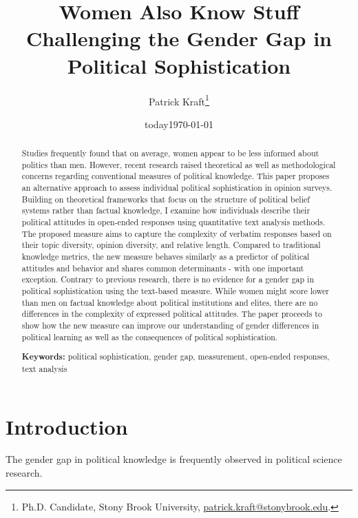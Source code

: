 \documentclass[12pt]{article}
\author{Patrick Kraft\footnote{Ph.D. Candidate, Stony Brook University, \href{mailto:patrick.kraft@stonybrook.edu}{patrick.kraft@stonybrook.edu}.
}}
\date{today}
\title{Women Also Know Stuff\\
\large{Challenging the Gender Gap in Political Sophistication}}
\date{\today}
\begin{document}
\maketitle\doublespacing\thispagestyle{empty}

\begin{abstract}\singlespacing
Studies frequently found that on average, women appear to be less informed about politics than men. However, recent research raised theoretical as well as methodological concerns regarding conventional measures of political knowledge. This paper proposes an alternative approach to assess individual political sophistication in opinion surveys. Building on theoretical frameworks that focus on the structure of political belief systems rather than factual knowledge, I examine how individuals describe their political attitudes in open-ended responses using quantitative text analysis methods. The proposed measure aims to capture the complexity of verbatim responses based on their topic diversity, opinion diversity, and relative length. Compared to traditional knowledge metrics, the new measure behaves similarly as a predictor of political attitudes and behavior and shares common determinants - with one important exception. Contrary to previous research, there is no evidence for a gender gap in political sophistication using the text-based measure. While women might score lower than men on factual knowledge about political institutions and elites, there are no differences in the complexity of expressed political attitudes. The paper proceeds to show how the new measure can improve our understanding of gender differences in political learning as well as the consequences of political sophistication. 

\vspace{\baselineskip}
\noindent \textbf{Keywords:} political sophistication, gender gap, measurement, open-ended responses, text analysis \\

\end{abstract}
\newpage\setcounter{page}{1}


\section*{Introduction}

The gender gap in political knowledge is frequently observed in political science research.
\end{document}
